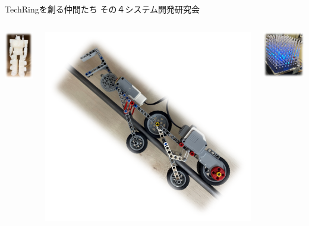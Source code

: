 \documentclass[dvipdfmx]{beamer}
\begin{document}
\begin{frame}{TechRingを創る仲間たち その４}{システム開発研究会}
  \begin{footnotesize}
    \begin{columns}
      \begin{column}{.18\textwidth}
        \includegraphics[scale=0.5]{pic/shisuken1.png}
      \end{column}
      \begin{column}{.18\textwidth}
        \includegraphics[scale=0.4]{pic/shisuken2.png}
      \end{column}
      \begin{column}{.18\textwidth}
        \begin{flushleft}
          \includegraphics[scale=0.4]{pic/shisuken3.png}

\end{flushleft}
\end{column}
\end{columns}
\end{footnotesize}
\end{frame}
\end{document}

